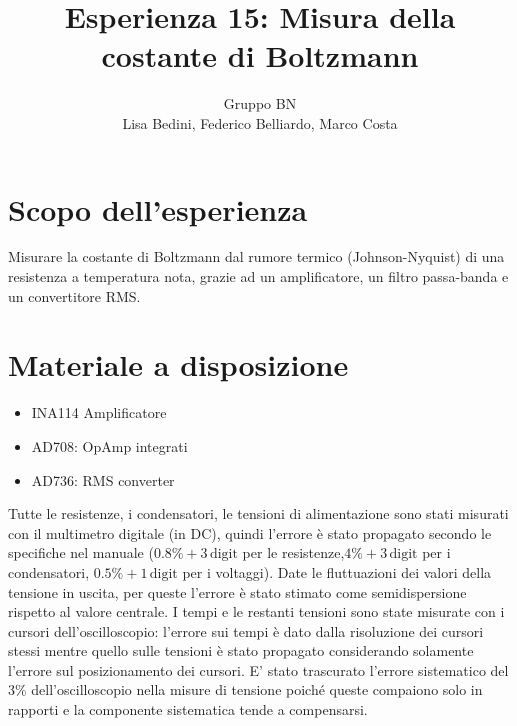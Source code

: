 \documentclass[10pt,a4paper]{article}
\author{Gruppo BN \\Lisa Bedini,  Federico Belliardo, Marco Costa}
\title{Esperienza 15: Misura della costante di Boltzmann}
\begin{document}
\maketitle
\section{Scopo dell'esperienza}
Misurare la costante di Boltzmann dal rumore termico (Johnson-Nyquist) di una resistenza a temperatura nota, grazie ad un amplificatore, un filtro passa-banda e un convertitore RMS.

\section{Materiale a disposizione}
\begin{itemize}
\item INA114 Amplificatore
\item AD708: OpAmp integrati
\item AD736: RMS converter
\end{itemize}

Tutte le resistenze, i condensatori, le tensioni di alimentazione sono stati misurati con il multimetro digitale (in DC), quindi l'errore è stato propagato secondo le specifiche nel manuale ($0.8\% + 3\,\mbox{digit}$ per le resistenze,$4\% + 3\, \mbox{digit}$  per i condensatori, $0.5\% + 1\,\mbox{digit}$ per i voltaggi).
Date le fluttuazioni dei valori della tensione in uscita,  per queste l'errore è stato stimato come semidispersione rispetto al valore centrale. I tempi e le restanti tensioni sono state misurate con i cursori dell'oscilloscopio: l'errore sui tempi è dato dalla risoluzione dei cursori stessi mentre quello sulle tensioni è stato propagato considerando solamente l'errore sul posizionamento dei cursori. E' stato trascurato l'errore sistematico del $3\%$ dell'oscilloscopio nella misure di tensione poiché queste compaiono solo in rapporti e la componente sistematica tende a compensarsi.

\end{document}
